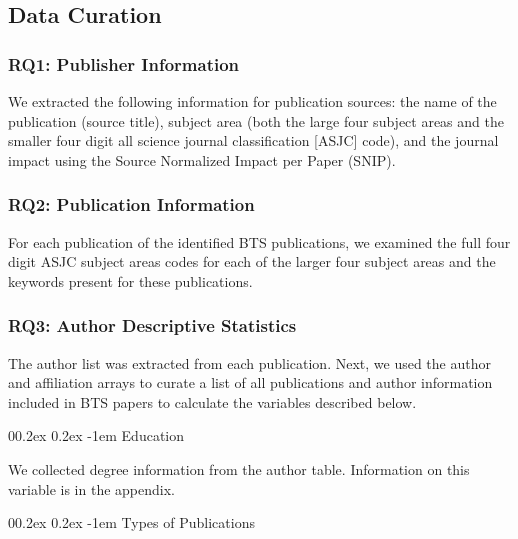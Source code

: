 \documentclass[
  man,mask,floatsintext]{apa7}
\makeatletter
\let\oldparagraph\paragraph
\renewcommand{\paragraph}[1]{\oldparagraph{#1}\mbox{}}
\renewcommand{\paragraph}{\@startsection{paragraph}{4}{\parindent}%
  {0\baselineskip \@plus 0.2ex \@minus 0.2ex}%
  {-1em}%
  {\normalfont\normalsize\bfseries\itshape\typesectitle}}
\renewcommand{\paragraph}{\@startsection{paragraph}{4}{\parindent}%
  {0\baselineskip \@plus 0.2ex \@minus 0.2ex}%
  {-1em}%
  {\normalfont\normalsize\bfseries\typesectitle}}
\makeatother
\begin{document}
\hypertarget{data-curation}{%
\subsection{Data Curation}\label{data-curation}}

\hypertarget{rq1-publisher-information}{%
\subsubsection{RQ1: Publisher Information}\label{rq1-publisher-information}}

We extracted the following information for publication sources: the name
of the publication (source title), subject area (both the large four
subject areas and the smaller four digit all science journal
classification {[}ASJC{]} code), and the journal impact using the Source
Normalized Impact per Paper (SNIP).

\hypertarget{rq2-publication-information}{%
\subsubsection{RQ2: Publication Information}\label{rq2-publication-information}}

For each publication of the identified BTS publications, we examined the
full four digit ASJC subject areas codes for each of the larger four
subject areas and the keywords present for these publications.

\hypertarget{rq3-author-descriptive-statistics}{%
\subsubsection{RQ3: Author Descriptive Statistics}\label{rq3-author-descriptive-statistics}}

The author list was extracted from each publication. Next, we used the
author and affiliation arrays to curate a list of all publications and
author information included in BTS papers to calculate the variables
described below.

\hypertarget{education}{%
\paragraph{Education}\label{education}}

We collected degree information from the author table.
Information on this variable is in the appendix.

\hypertarget{types-of-publications}{%
\paragraph{Types of Publications}\label{types-of-publications}}
\end{document}
